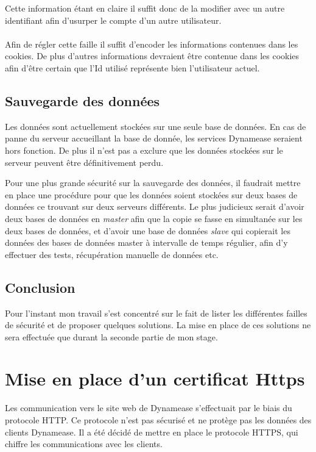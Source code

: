 Cette information étant en claire il suffit donc de la modifier avec un autre identifiant afin d'usurper le compte d'un autre utilisateur.
\\\\

Afin de régler cette faille il suffit d'encoder les informations contenues dans les cookies. De plus d'autres informations devraient être contenue dans les cookies afin d'être certain que l'Id utilisé représente bien l'utilisateur actuel. 

\subsection{Sauvegarde des données}

Les données sont actuellement stockées sur une seule base de données. En cas de panne du serveur accueillant la base de donnée, les services Dynamease seraient hors fonction. De plus il n'est pas a exclure que les données stockées sur le serveur peuvent être définitivement perdu. 

Pour une plus grande sécurité sur la sauvegarde des données, il faudrait mettre en place une procédure pour que les données soient stockées sur deux bases de données ce trouvant sur deux serveurs différents. Le plus judicieux serait d'avoir deux bases de données en \textit{master} afin que la copie se fasse en simultanée sur les deux bases de données, et d'avoir une base de données \textit{slave} qui copierait les données des bases de données master à intervalle de temps régulier, afin d'y effectuer des tests, récupération manuelle de données etc.

\subsection{Conclusion}

Pour l'instant mon travail s'est concentré sur le fait de lister les différentes failles de sécurité et de proposer quelques solutions. La mise en place de ces solutions ne sera effectuée que durant la seconde partie de mon stage.

\section{Mise en place d'un certificat Https}

Les communication vers le site web de Dynamease s'effectuait par le biais du protocole HTTP. Ce protocole n'est pas sécurisé et ne  protège pas les données des clients Dynamease. Il a été décidé de mettre en place le protocole HTTPS, qui chiffre les communications avec les clients.


